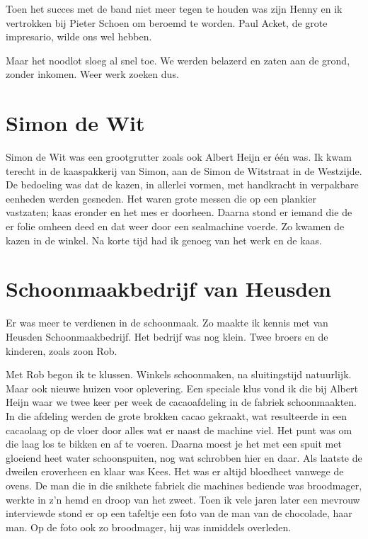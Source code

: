 \documentclass[10pt,twoside, openright]{memoir}
\begin{document}
Toen het succes met de band niet meer tegen te houden was zijn Henny en ik vertrokken bij Pieter Schoen om beroemd te worden. Paul Acket, de grote impresario, wilde ons wel hebben.

Maar het noodlot sloeg al snel toe. We werden belazerd en zaten aan de grond, zonder inkomen. Weer werk zoeken dus.

\section{Simon de Wit} %
\label{cha:wit}

Simon de Wit was een grootgrutter zoals ook Albert Heijn er één was. Ik kwam terecht in de kaaspakkerij van Simon, aan de Simon de Witstraat in de Westzijde. De bedoeling was dat de kazen, in allerlei vormen, met handkracht in verpakbare eenheden werden gesneden. Het waren grote messen die op een plankier vastzaten; kaas eronder en het mes er doorheen. Daarna stond er iemand die de er folie omheen deed en dat weer door een sealmachine voerde. Zo kwamen de kazen in de winkel. Na korte tijd had ik genoeg van het werk en de kaas.

\section{Schoonmaakbedrijf van Heusden} %
\label{cha:schoonmaakbedrijf}

Er was meer te verdienen in de schoonmaak. Zo maakte ik kennis met van Heusden Schoonmaakbedrijf. Het bedrijf was nog klein. Twee broers en de kinderen, zoals zoon Rob. 

Met Rob begon ik te klussen. Winkels schoonmaken, na sluitingstijd natuurlijk. Maar ook nieuwe huizen voor oplevering. Een speciale klus vond ik die bij Albert Heijn waar we twee keer per week de cacaoafdeling in de fabriek schoonmaakten. In die afdeling werden de grote brokken cacao gekraakt, wat resulteerde in een cacaolaag op de vloer door alles wat er naast de machine viel. Het punt was om die laag los te bikken en af te voeren. Daarna moest je het met een spuit met gloeiend heet water schoonspuiten, nog wat schrobben hier en daar. Als laatste de dweilen eroverheen en klaar was Kees. Het was er altijd bloedheet vanwege de ovens. De man die in die snikhete fabriek die machines bediende was broodmager, werkte in z’n hemd en droop van het zweet. Toen ik vele jaren later een mevrouw interviewde stond er op een tafeltje een foto van de man van de chocolade, haar man. Op de foto ook zo broodmager, hij was inmiddels overleden.
\end{document}
